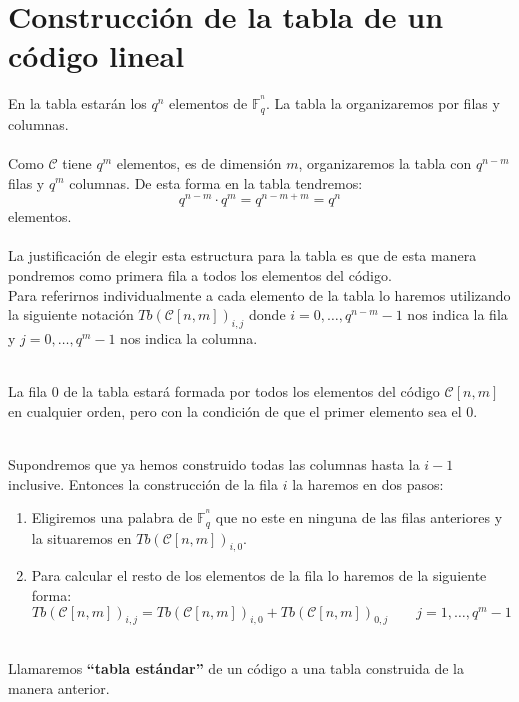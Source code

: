 %
%

%
\newpage
%
\section{Construcci\'on de la tabla de un c\'odigo lineal}

En la tabla estar\'an los $q^n$ elementos de $\mathbb{F}^{^n}_q$. La tabla
la organizaremos por filas y columnas.\\ \\
%
Como $\mathcal{C}$ tiene $q^m$ elementos, es de dimensi\'on $m$, organizaremos
la tabla con $q^{n-m}$ filas y $q^m$ columnas. De esta forma en la tabla
tendremos: $$q^{n-m}\cdot q^m=q^{n-m+m}=q^n$$ elementos.\\ \\
%
La justificaci\'on de elegir esta estructura para la tabla es que de esta manera
pondremos como primera fila a todos los elementos del c\'odigo.\\

Para referirnos individualmente a cada elemento de la tabla lo haremos
utilizando la siguiente notaci\'on $Tb(\mathcal{C}[n,m])_{i,j}$ donde 
$i=0,\dots,q^{n-m}-1$ nos indica la fila y $j=0,\dots,q^m-1$ nos
indica la columna.
\begin{definicion}
\ \\
La fila $0$ de la tabla estar\'a formada por todos los elementos del c\'odigo
$\mathcal{C}[n,m]$ en cualquier orden, pero con la condici\'on de que el primer
elemento sea el $0$.
\end{definicion}
%
%
\begin{definicion}
\ \\
Supondremos que ya hemos construido todas las columnas hasta la $i-1$ inclusive.
Entonces la construcci\'on de la fila $i$ la haremos en dos pasos:
\begin{enumerate}
\item Eligiremos una palabra de $\mathbb{F}^{^n}_q$ que no este en ninguna de
las filas anteriores y la situaremos en $Tb(\mathcal{C}[n,m])_{i,0}$.
\item Para calcular el resto de los elementos de la fila lo haremos de la
siguiente forma:
\begin{displaymath}
Tb(\mathcal{C}[n,m])_{i,j} = Tb(\mathcal{C}[n,m])_{i,0}+
Tb(\mathcal{C}[n,m])_{0,j}\qquad j=1,\dots,q^m-1
\end{displaymath}
\end{enumerate}
\end{definicion}
%
%
\begin{definicion}
\ \\
Llamaremos \textbf{``tabla est\'andar''} de un c\'odigo a una tabla construida
de la manera anterior.
\end{definicion}
